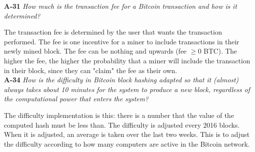 \documentclass[a4paper]{article}
\newcommand{\Q}[2]{
  \textbf{#1} \textit{#2}
 }
\newcommand{\A}[1]{ #1 \\ }
\begin{document}
\Q{A-31} {How much is the transaction fee for a Bitcoin transaction and how is it 
determined?}

\A{
  The transaction fee is determined by the user that wants the transaction performed.
  The fee is one incentive for a miner to include transactions in their newly mined block.
  The fee can be nothing and upwards (fee $\geq 0$ BTC). The higher the fee, the higher the probability
  that a miner will include the transaction in their block, since they can "claim" the fee as their own.
}

\Q{A-34} {How  is  the  difficulty  in  Bitcoin  block  hashing  adapted  so  that  it  
(almost)  always  takes  about  10 minutes for the system to produce a new block, 
regardless of the computational power that enters the system?}

\A{
  The difficulty implementation is this: there is a number that the value of the 
  computed hash must be less than.
  The difficulty is adjusted every 2016 blocks. When it is adjusted, an average is taken
  over the last two weeks. This is to adjust the difficulty according to how many computers
  are active in the Bitcoin network.
}


\end{document}
